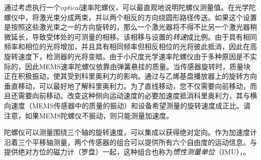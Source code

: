 通过考虑执行一个\emph{optical}速率陀螺仪，可以最直观地说明陀螺仪测量值。在光学陀螺仪中，将激光束分成两束，并以两个相反的方向绕圆形路径传送。如果这个设置是按照这些激光束之一的方向旋转的，那么一个激光器将不得不比另一个激光器稍微延长，导致受体处的可测量的相移。该相移与设置的\emph{转速}成比例。由于具有相同频率和相位的光将增加，并且具有相同频率但相反相位的光将彼此抵消，因此在高旋转速度下，检测器的光将变暗。由于小尺度光学速率陀螺仪由于多种原因是不实际的，因此MEMS速率陀螺仪依靠由弹簧悬挂的质量。当传感器旋转时，质量块正在积极振动，使其受到科里奥利力的影响。通过与乙烯基盘播放器上的旋转方向垂直移动，可以最好地了解科里奥利力。为了直线移动，您不仅需要向前移动，而且还需要向前移动。改变这种侧向运动速度的必要加速度抵消科里奥利力，其与横向速度（MEMS传感器中的质量的振动）和设备希望测量的旋转速度成正比。请注意，如果MEMS陀螺仪不振动，则只能测量加速度。

陀螺仪可以测量围绕三个轴的旋转速度，可以集成以获得绝对定向。作为加速度计沿着三个平移轴测量，两个传感器的组合可以提供所有六个自由度的运动信息。与提供绝对方位的磁力计（罗盘）一起，这种组合也称为\emph{惯性测量单位}（IMU），。



